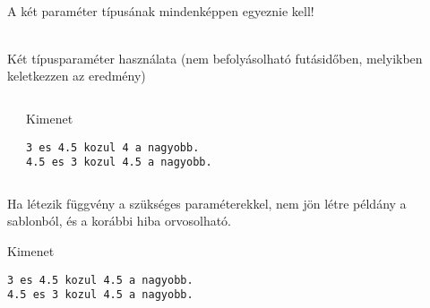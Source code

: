 \documentclass[usenames,dvipsnames,aspectratio=169]{beamer}
\begin{document}
\begin{frame}
    \begin{description}[m]
        \item[Probléma:] \hfill \\ A két paraméter típusának mindenképpen egyeznie kell!
        \item[Félmegoldás:] \hfill \\ Két típusparaméter használata (nem befolyásolható futásidőben, melyikben keletkezzen az eredmény)  
    \end{description}
\end{frame}

\begin{frame}[fragile]
    \begin{columns}[T]
            \begin{exampleblock}{}
                \scriptsize
                
            \end{exampleblock}
            \begin{block}{Kimenet}
                \footnotesize
                \vspace{-.4cm}
                \begin{verbatim}
3 es 4.5 kozul 4 a nagyobb.
4.5 es 3 kozul 4.5 a nagyobb.
                \end{verbatim}
                \vspace{-.4cm}
            \end{block}
    \end{columns}
\end{frame}

\begin{frame}[fragile]
    Ha létezik függvény a szükséges paraméterekkel, nem jön létre példány a sablonból, és a korábbi hiba orvosolható.
    \begin{exampleblock}{}
        \scriptsize
        
    \end{exampleblock}
    \begin{block}{Kimenet}
        \footnotesize
        \vspace{-.4cm}
        \begin{verbatim}
3 es 4.5 kozul 4.5 a nagyobb.
4.5 es 3 kozul 4.5 a nagyobb.
        \end{verbatim}
        \vspace{-.4cm}
    \end{block}
\end{frame}
\end{document}
